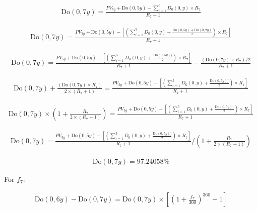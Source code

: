 \documentclass[12pt]{article}
\begin{document}
\begin{gather*}
\text{Do}(0, 7y) = \frac{PV_{5y}^{} + \text{Do}(0, 5y) - \sum_{i=1}^{6} D_0(0, y) \times R_7}{R_7 + 1}
\end{gather*}

\begin{gather*}
\text{Do}(0, 7y) = \frac{PV_{5y}^{} + \text{Do}(0, 5y) - \left[\left(\sum_{i=1}^{5} D_0(0, y) + \frac{\text{Do}(0, 5y) + \text{Do}(0, 7y)}{2} \right) \times R_7 \right]}{R_7 + 1}
\end{gather*}

\begin{gather*}
\text{Do}(0, 7y) = \frac{PV_{5y}^{} + \text{Do}(0, 5y) - \left[\left(\sum_{i=1}^{5} D_0(0, y) + \frac{\text{Do}(0, 5y))}{2} \right) \times R_7 \right]}{R_7 + 1} - \frac{\left( \text{Do}(0, 7y) \times R_7 \right) /2}{R_7 + 1}
\end{gather*}

\begin{gather*}
\text{Do}(0, 7y) + \frac{\left( \text{Do}(0, 7y) \times R_7 \right) }{2 \times \left( R_7 + 1 \right)}
= \frac{PV_{5y}^{} + \text{Do}(0, 5y) - \left[\left(\sum_{i=1}^{5} D_0(0, y) + \frac{\text{Do}(0, 5y))}{2} \right) \times R_7 \right]}{R_7 + 1}
\end{gather*}

\begin{gather*}
\text{Do}(0, 7y) \times \left( 1 + \frac{R_7}{2 \times \left( R_7 + 1 \right)} \right)
= \frac{PV_{5y}^{} + \text{Do}(0, 5y) - \left[\left(\sum_{i=1}^{5} D_0(0, y) + \frac{\text{Do}(0, 5y))}{2} \right) \times R_7 \right]}{R_7 + 1}
\end{gather*}

\begin{gather*}
\text{Do}(0, 7y) 
= \frac{PV_{5y}^{} + \text{Do}(0, 5y) - \left[\left(\sum_{i=1}^{5} D_0(0, y) + \frac{\text{Do}(0, 5y))}{2} \right) \times R_7 \right]}{R_7 + 1} / 
\left( 1 + \frac{R_7}{2 \times \left( R_7 + 1 \right)} \right)
\end{gather*}

\begin{gather*}
\text{Do}(0, 7y) = \underline{
97.24058\%}
\end{gather*}

\noindent For \(f_7\):

\begin{gather*}
\text{Do}(0, 6y) - \text{Do}(0, 7y)
= \text{Do}(0, 7y) \times \left[\left(1 + \frac{f_7}{360}\right)^{360} - 1\right]
\end{gather*}
\end{document}
